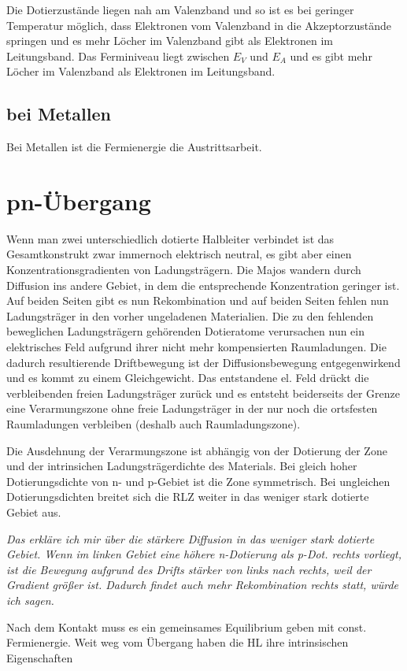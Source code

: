 \documentclass[paper=a4,10pt]{scrartcl}
\begin{document}
Die Dotierzustände liegen nah am Valenzband und so ist es bei geringer Temperatur möglich, dass Elektronen vom Valenzband in die Akzeptorzustände springen und es mehr Löcher im Valenzband gibt als Elektronen im Leitungsband. Das Ferminiveau liegt zwischen $E_V$ und $E_A$ und es gibt mehr Löcher im Valenzband als Elektronen im Leitungsband.

\subsection{bei Metallen}
Bei Metallen ist die Fermienergie die Austrittsarbeit.

\section{pn-Übergang}
Wenn man zwei unterschiedlich dotierte Halbleiter verbindet ist das Gesamtkonstrukt zwar immernoch elektrisch neutral, es gibt aber einen Konzentrationsgradienten von Ladungsträgern. Die Majos wandern durch Diffusion ins andere Gebiet, in dem die entsprechende Konzentration geringer ist. Auf beiden Seiten gibt es nun Rekombination und auf beiden Seiten fehlen nun Ladungsträger in den vorher ungeladenen Materialien. Die zu den fehlenden beweglichen Ladungsträgern gehörenden Dotieratome verursachen nun ein elektrisches Feld aufgrund ihrer nicht mehr kompensierten Raumladungen. Die dadurch resultierende Driftbewegung ist der Diffusionsbewegung entgegenwirkend und es kommt zu einem Gleichgewicht. Das entstandene el. Feld drückt die verbleibenden freien Ladungsträger zurück und es entsteht beiderseits der Grenze eine Verarmungszone ohne freie Ladungsträger in der nur noch die ortsfesten Raumladungen verbleiben (deshalb auch Raumladungszone).

Die Ausdehnung der Verarmungszone ist abhängig von der Dotierung der Zone und der intrinsichen Ladungsträgerdichte des Materials. Bei gleich hoher Dotierungsdichte von n- und p-Gebiet ist die Zone symmetrisch. Bei ungleichen Dotierungsdichten breitet sich die RLZ weiter in das weniger stark dotierte Gebiet aus.

\textit{Das erkläre ich mir über die stärkere Diffusion in das weniger stark dotierte Gebiet. Wenn im linken Gebiet eine höhere n-Dotierung als p-Dot. rechts vorliegt, ist die Bewegung aufgrund des Drifts stärker von links nach rechts, weil der Gradient größer ist. Dadurch findet auch mehr Rekombination rechts statt, würde ich sagen.}

Nach dem Kontakt muss es ein gemeinsames Equilibrium geben mit const. Fermienergie. Weit weg vom Übergang haben die HL ihre intrinsischen Eigenschaften
\end{document}
